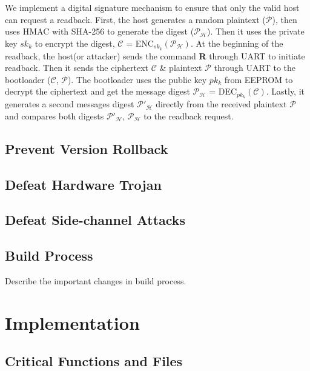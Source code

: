\documentclass[11pt,oneside,onecolumn,letterpaper]{article}
\begin{document}
We implement a digital signature mechanism to ensure that only the valid host can request a readback.
First, the host generates a random plaintext ($\mathcal{P}$), then uses HMAC with SHA-256 to generate the digest ($\mathcal{P_H}$).
Then it uses the private key $sk_k$ to encrypt the digest, $\mathcal{C}$ = ENC$_{sk_k}(\mathcal{P_H})$.
At the beginning of the readback, the host(or attacker) sends the command \textbf{R} through UART to initiate readback.
Then it sends the ciphertext $\mathcal{C}$ \& plaintext $\mathcal{P}$ through UART to the bootloader ($\mathcal{C}$, $\mathcal{P}$).
The bootloader uses the public key $pk_k$ from EEPROM to decrypt the ciphertext and get the message digest $\mathcal{P_H}$ = DEC$_{pk_k}(\mathcal{C})$.
Lastly, it generates a second messages digest $\mathcal{P'_H}$ directly from the received plaintext $\mathcal{P}$ and compares both digests $\mathcal{P'_H}$, $\mathcal{P_H}$ to the readback request.

\subsection{Prevent Version Rollback}
  
\subsection{Defeat Hardware Trojan}

\subsection{Defeat Side-channel Attacks}

\subsection{Build Process}

  Describe the important changes in build process.

\section{Implementation}
\subsection{Critical Functions and Files}



\end{document}

